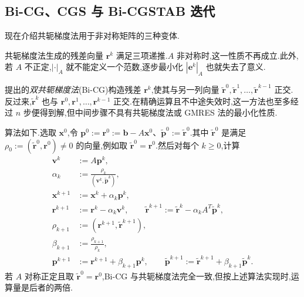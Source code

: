 \subsection{Bi-CG、CGS 与 Bi-CGSTAB 迭代}\label{sec:2.6.3}

现在介绍共轭梯度法用于非对称矩阵的三种变体.

共轭梯度法生成的残差向量 \(\boldsymbol{r}^k\) 满足三项递推.\(A\) 非对称时,这一性质不再成立.此外,若 \(A\) 不正定,\(|\cdot|_A\) 就不能定义一个范数,逐步最小化 \(|\boldsymbol{e}^k|_A\) 也就失去了意义.

提出的\emph{双共轭梯度法}(Bi-CG)构造残差 \(\boldsymbol{r}^k\),使其与另一列向量 \(\widetilde{\boldsymbol{r}}^0,\widetilde{\boldsymbol{r}}^1,\ldots,\widetilde{\boldsymbol{r}}^{k-1}\) 正交.反过来,\(\widetilde{\boldsymbol{r}}^k\) 也与 \(\boldsymbol{r}^0,\boldsymbol{r}^1,\ldots,\boldsymbol{r}^{k-1}\) 正交.在精确运算且不中途失效时,这一方法也至多经过 \(n\) 步便得到解,但中间步骤不具有共轭梯度法或 GMRES 法的最小化性质.

算法如下.选取 \(\boldsymbol{x}^0\),令 \(\boldsymbol{p}^0:=\boldsymbol{r}^0:=\boldsymbol{b}-A\boldsymbol{x}^0\)、\(\widetilde{\boldsymbol{p}}^0:=\widetilde{\boldsymbol{r}}^0\).其中 \(\widetilde{\boldsymbol{r}}^0\) 是满足 \(\rho_0:=(\widetilde{\boldsymbol{r}}^0,\boldsymbol{r}^0)\ne0\) 的向量,例如取 \(\widetilde{\boldsymbol{r}}^0=\boldsymbol{r}^0\).然后对每个 \(k\ge0\),计算
\begin{align}
  \boldsymbol{v}^k&:=A\boldsymbol{p}^k,\label{eq:2.6.24}\\
  \alpha_k&:=\frac{\rho_k}{(\boldsymbol{v}^k,\widetilde{\boldsymbol{p}}^k)},\label{eq:2.6.25}\\
  \boldsymbol{x}^{k+1}&:=\boldsymbol{x}^k+\alpha_k\boldsymbol{p}^k,\label{eq:2.6.26}\\
  \boldsymbol{r}^{k+1}&:=\boldsymbol{r}^k-\alpha_k\boldsymbol{v}^k,\qquad
  \widetilde{\boldsymbol{r}}^{k+1}:=\widetilde{\boldsymbol{r}}^k-\alpha_k A^T\widetilde{\boldsymbol{p}}^k,\label{eq:2.6.27}\\
  \rho_{k+1}&:=(\boldsymbol{r}^{k+1},\widetilde{\boldsymbol{r}}^{k+1}),\label{eq:2.6.28}\\
  \beta_{k+1}&:=\frac{\rho_{k+1}}{\rho_k},\label{eq:2.6.29}\\
  \boldsymbol{p}^{k+1}&:=\boldsymbol{r}^{k+1}+\beta_{k+1}\boldsymbol{p}^k,\qquad
  \widetilde{\boldsymbol{p}}^{k+1}:=\widetilde{\boldsymbol{r}}^{k+1}+\beta_{k+1}\widetilde{\boldsymbol{p}}^k.\label{eq:2.6.30}
\end{align}
若 \(A\) 对称正定且取 \(\widetilde{\boldsymbol{r}}^0=\boldsymbol{r}^0\),Bi-CG 与共轭梯度法完全一致,但按上述算法实现时,运算量是后者的两倍.

